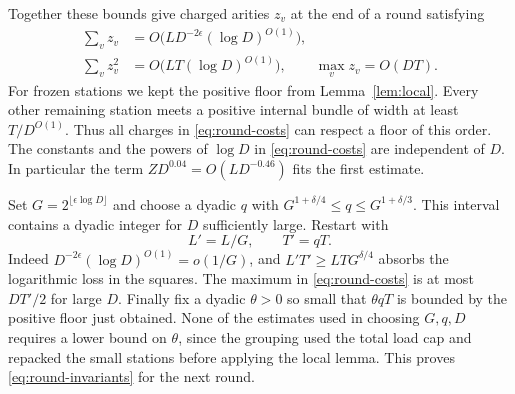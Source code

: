 Together these bounds give charged arities $z_v$ at the end of a
round satisfying
\begin{equation}\label{eq:round-costs}
 \begin{aligned}
 \sum_v z_v&=O\bigl(LD^{-2\epsilon}(\log D)^{O(1)}\bigr),\\
 \sum_v z_v^2&=O\bigl(LT(\log D)^{O(1)}\bigr),\qquad
                   \max_v z_v=O(DT).
 \end{aligned}
\end{equation}
For frozen stations we kept the positive floor from
Lemma~\ref{lem:local}. Every other remaining station meets a positive
internal bundle of width at least $T/D^{O(1)}$. Thus all charges in
\eqref{eq:round-costs} can respect a floor of this order. The constants
and the powers of $\log D$ in \eqref{eq:round-costs} are independent
of $D$. In particular the term $ZD^{0.04}=O(LD^{-0.46})$ fits the
first estimate.

Set $G=2^{\lfloor\epsilon\log D\rfloor}$ and choose a dyadic $q$ with
$G^{1+\delta/4}\le q\le G^{1+\delta/3}$. This interval contains a
dyadic integer for $D$ sufficiently large. Restart with
\begin{equation}\label{eq:round-target}
                 L'=L/G,\qquad T'=qT .
\end{equation}
Indeed $D^{-2\epsilon}(\log D)^{O(1)}=o(1/G)$, and
$L'T'\ge LTG^{\delta/4}$ absorbs the logarithmic loss in the squares.
The maximum in \eqref{eq:round-costs} is at most $DT'/2$ for large $D$.
Finally fix a dyadic $\theta>0$ so small that $\theta qT$ is bounded by
the positive floor just obtained. None of the estimates used in choosing
$G,q,D$ requires a lower bound on $\theta$, since the grouping used the total
load cap and repacked the small stations before applying the local lemma.
This proves \eqref{eq:round-invariants} for the next round.


